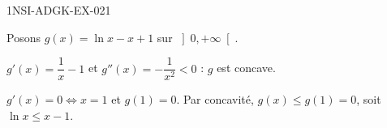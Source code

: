 \begin{corrige}{1NSI-ADGK-EX-021}

Posons $g(x) = \ln x - x + 1$ sur $\left]0, +\infty\right[$.


$g'(x) = \dfrac{1}{x} - 1$ et $g''(x) = -\dfrac{1}{x^2} < 0$ : $g$ est concave.

$g'(x) = 0 \iff x = 1$ et $g(1) = 0$. Par concavité, $g(x) \leq g(1) = 0$, soit $\ln x \leq x - 1$.

\end{corrige}
